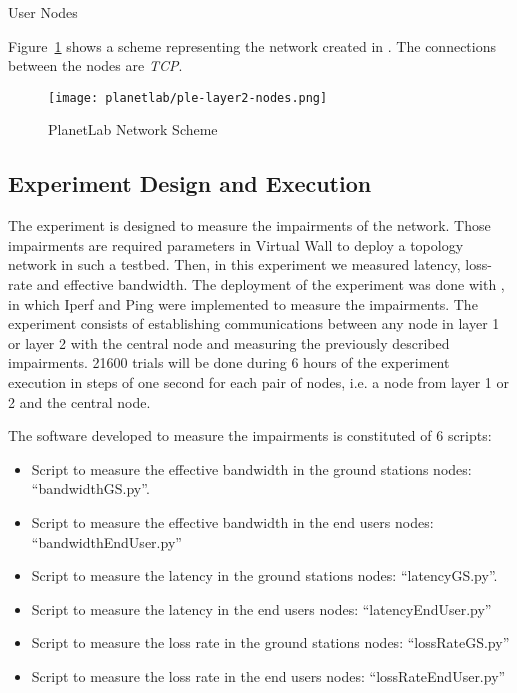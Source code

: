 \begin{table}[hp]
  \centering
  {\small
  
  }
  \caption{User Nodes}
  \label{tab:ple-tablelayer2-nodes}
\end{table}


Figure~\ref{fig:ple-network-scheme} shows a scheme representing the network created in \pl. The
connections between the nodes are \emph{TCP}.

\begin{figure}[!h]
\begin{center}
\texttt{[image: planetlab/ple-layer2-nodes.png]}

\caption{PlanetLab Network Scheme}
\label{fig:ple-network-scheme}
\end{center}
\end{figure}

\subsection{Experiment Design and Execution}

The experiment is designed to measure the impairments of the network. Those impairments are required parameters in Virtual Wall to deploy a topology network in such a testbed. Then, in this experiment we measured latency, loss-rate and effective bandwidth. The deployment of the experiment was done with \nepi, in which Iperf and Ping were implemented to measure the impairments. The experiment consists of establishing communications between any node in layer 1 or layer 2 with the central node and measuring the previously described impairments. 21600 trials will be done during 6 hours of the experiment execution in steps of one second for each pair of nodes, i.e. a node from layer 1 or 2 and the central node.

The software developed to measure the impairments is constituted of 6 scripts:
\begin{itemize}
\item Script to measure the effective bandwidth in the ground stations nodes: “bandwidthGS.py”. 
\item Script to measure the effective bandwidth in the end users nodes: “bandwidthEndUser.py”
\item Script to measure the latency in the ground stations nodes: “latencyGS.py”.
\item Script to measure the latency  in the end users nodes: “latencyEndUser.py”
\item Script to measure the loss rate in the ground stations nodes: “lossRateGS.py”
\item Script to measure the loss rate in the end users nodes:
  “lossRateEndUser.py”

\end{itemize}

